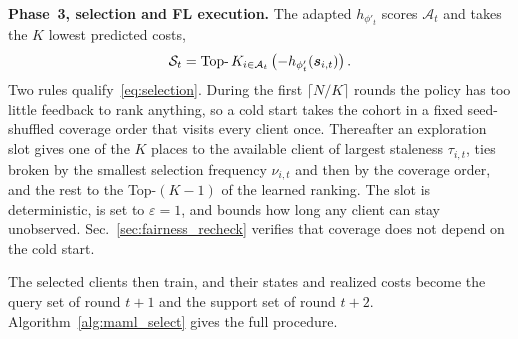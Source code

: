 \documentclass[journal]{IEEEtran}
\theoremstyle{remark}
\newcommand{\revision}[1]{#1}
\newcommand{\revtwo}[1]{#1}
\begin{document}
\textbf{Phase~3\revtwo{, selection and FL execution}.}
\revision{The adapted $h_{\phi'_t}$ scores $\mathcal{A}_t$ and takes the $K$ lowest predicted costs,}
\begin{equation}
	\color{black}
	\mathcal{S}_t = \operatorname{Top-}K_{i \in \mathcal{A}_t} \left( -h_{\phi'_t}(\bm{s}_{i,t}) \right).
	\label{eq:selection}
\end{equation}
\revtwo{Two rules qualify~\eqref{eq:selection}. During the first $\lceil N/K\rceil$ rounds the policy has too little feedback to rank anything, so a cold start takes the cohort in a fixed seed-shuffled coverage order that visits every client once. Thereafter an exploration slot gives one of the $K$ places to the available client of largest staleness $\tau_{i,t}$, ties broken by the smallest selection frequency $\nu_{i,t}$ and then by the coverage order, and the rest to the Top-$(K-1)$ of the learned ranking. The slot is deterministic, is set to $\varepsilon=1$, and bounds how long any client can stay unobserved. Sec.~\ref{sec:fairness_recheck} verifies that coverage does not depend on the cold start.}

\revision{The selected clients then train, and their states and realized costs become the query set of round $t+1$ and the support set of round $t+2$. Algorithm~\ref{alg:maml_select} gives the full procedure.}
\end{document}
